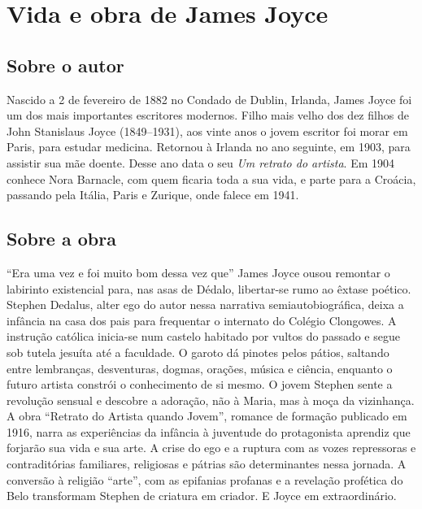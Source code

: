 \chapter{Vida e obra de James Joyce}

\section{Sobre o autor}

Nascido a 2 de fevereiro de 1882 no Condado de Dublin, Irlanda, James Joyce foi um dos mais importantes escritores modernos. Filho mais velho dos dez filhos de John Stanislaus Joyce (1849--1931), aos vinte anos o jovem escritor foi morar em Paris, para estudar medicina. Retornou à Irlanda no ano seguinte, em 1903, para assistir sua mãe doente. Desse ano data o seu \emph{Um retrato do artista}. 
Em 1904 conhece Nora Barnacle, com quem ficaria toda a sua vida, e parte para a Croácia, passando pela Itália, Paris e Zurique, onde falece em 1941.


\section{Sobre a obra}

``Era uma vez e foi muito bom dessa vez que'' James Joyce ousou remontar
o labirinto existencial para, nas asas de Dédalo, libertar-se rumo ao
êxtase poético. Stephen Dedalus, alter ego do autor nessa narrativa
semiautobiográfica, deixa a infância na casa dos pais para frequentar o
internato do Colégio Clongowes. A instrução católica inicia-se num
castelo habitado por vultos do passado e segue sob tutela jesuíta até a
faculdade. O garoto dá pinotes pelos pátios, saltando entre lembranças,
desventuras, dogmas, orações, música e ciência, enquanto o futuro
artista constrói o conhecimento de si mesmo. O jovem Stephen sente a
revolução sensual e descobre a adoração, não à Maria, mas à moça da
vizinhança. A obra ``Retrato do Artista quando Jovem'', romance de
formação publicado em 1916, narra as experiências da infância à
juventude do protagonista aprendiz que forjarão sua vida e sua arte. A
crise do ego e a ruptura com as vozes repressoras e contraditórias
familiares, religiosas e pátrias são determinantes nessa jornada. A
conversão à religião ``arte'', com as epifanias profanas e a revelação
profética do Belo transformam Stephen de criatura em criador. E Joyce em
extraordinário.

